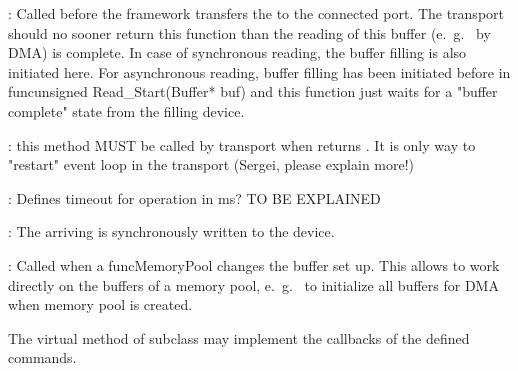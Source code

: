 \begin{compactenum}
\begin{compactdesc}
	
	\item [\func{unsigned Read\_Complete(Buffer* buf)}] :
	Called before the framework transfers the 
	to the connected port. The transport should no sooner return this function
	 than the reading of this buffer (e.~g.~ by DMA) 
	 is complete. In case of synchronous reading, the buffer filling is also
	 initiated here. For asynchronous reading, 
	 buffer filling has been initiated before
	 in func{unsigned Read\_Start(Buffer* buf)} and this function just waits
	 for a "buffer complete" state from the filling device.
      
	\item [\func{void Read\_CallBack(unsigned compl\_res = DataInput::di\_Ok)}] :
	this method MUST be called by transport when  
	returns . It is only way to "restart" event loop in the transport (Sergei, please explain more!)
	
	\item [\func{double Read\_Timeout()}] :
	Defines timeout for operation in ms? TO BE EXPLAINED
	
	\item [\func{bool WriteBuffer(Buffer* buf)}] : 
	The arriving  is synchronously written to the device.	
         
	\item [\func{void ProcessPoolChanged(MemoryPool* pool)}] : 	
	Called when a func{MemoryPool} changes the buffer set up. 
	This allows to work directly on the buffers
	of a memory pool, e.~g.~ to initialize all buffers for DMA when
	memory pool is created.  
	  

\end{compactdesc}
      
      
\item  The virtual  method of  
      subclass may implement the callbacks of the defined commands.


\end{compactenum}

